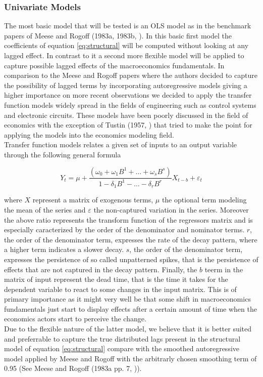 \subsubsection{Univariate Models}
\label{sub:univariate}

The most basic model that will be tested is an OLS model as in the benchmark papers of Meese
and Rogoff (1983a, 1983b, \cite{MeeseRogoffa, MeeseRogoffb}). In this basic first model the
coefficients of equation \ref{eq:structural} will be computed without looking at any lagged effect.
In contrast to it a second more flexible model will be applied to capture possible lagged effects
of the macroeconomics fundamentals. In comparison to the Meese and Rogoff papers where the authors decided
to capture the possibility of lagged terms by incorporating autoregressive models giving a higher
importance on more recent observations we decided to apply the transfer function models widely spread in
the fields of engineering such as control systems and electronic circuits. These models have been poorly
discussed in the field of economics with the exception of Tustin (1957, \cite{Tustin}) that tried to
make the point for applying the models into the economics modeling field.\\
Transfer function models relates a given set of inputs to an output variable through the following general formula

\begin{equation} \label{eq:transfer}
  Y_{t} = \mu + \frac{(\omega_{0}+\omega_{1}B^{1}+\dots+\omega_{s}B^{s})}{1-\delta_{1}B^{1}-\dots-\delta_{r}B^{r}}X_{t-b} + \varepsilon_{t}
\end{equation}

where $X$ represent a matrix of exogenous terms, $\mu$ the optional term modeling the mean of the series and
$\varepsilon$ the non-captured variation in the series. Moreover the above ratio represents the transform
function of the regressors matrix and is especially caracterized by the order of the denominator and
nominator terms. $r$, the order of the denominator term, expresses the rate of the decay pattern, where
a higher term indicates a slower decay.  $s$, the order of the denominator term, expresses the persistence of
so called unpatterned spikes, that is the persistence of effects that are not captured in the decay pattern.
Finally, the $b$ teerm in the matrix of input represent the dead time, that is the time it takes for the dependent
variable to react to some changes in the input matrix. This is of primary importance as it might very well be
that some shift in macroeconomics fundamentals just start to display effects after a certain amount of time when
the economics actors start to perceive the change.\\
Due to the flexible nature of the latter model, we believe that it is better suited and preferrable to
capture the true distributed lags present in the structural model of equation \ref{eq:structural} compare with
the smoothed autoregressive model applied by Meese and Rogoff with the arbitrarly chosen smoothing
term of 0.95 (See Meese and Rogoff (1983a pp. 7, \cite{MeeseRogoffa})).


